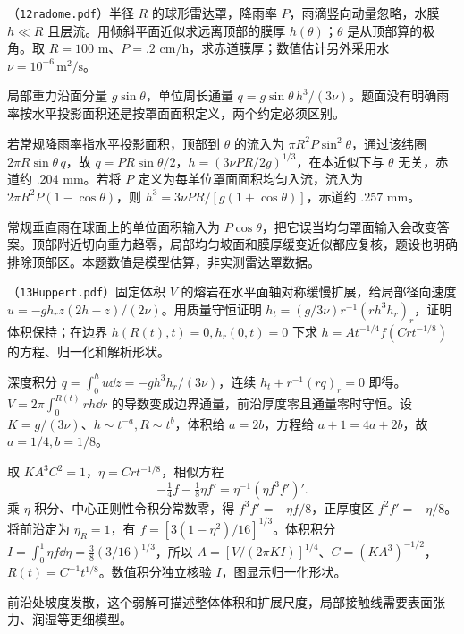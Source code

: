 \begin{exercise}
（\texttt{12radome.pdf}）半径 $R$ 的球形雷达罩，降雨率 $P$，雨滴竖向动量忽略，水膜 $h\ll R$ 且层流。用倾斜平面近似求远离顶部的膜厚 $h(\theta)$；$\theta$ 是从顶部算的极角。取 $R=100$ m、$P=.2$ cm/h，求赤道膜厚；数值估计另外采用水 $\nu=10^{-6}\,\mathrm{m^2/s}$。
\end{exercise}
\begin{solution}
局部重力沿面分量 $g\sin\theta$，单位周长通量 $q=g\sin\theta\,h^3/(3\nu)$。题面没有明确雨率按水平投影面积还是按罩面面积定义，两个约定必须区别。

若常规降雨率指水平投影面积，顶部到 $\theta$ 的流入为 $\pi R^2P\sin^2\theta$，通过该纬圈 $2\pi R\sin\theta\,q$，故 $q=PR\sin\theta/2$，$h=(3\nu PR/2g)^{1/3}$，在本近似下与 $\theta$ 无关，赤道约 $.204$ mm。若将 $P$ 定义为每单位罩面面积均匀入流，流入为 $2\pi R^2P(1-\cos\theta)$，则 $h^3=3\nu PR/[g(1+\cos\theta)]$，赤道约 $.257$ mm。

常规垂直雨在球面上的单位面积输入为 $P\cos\theta$，把它误当均匀罩面输入会改变答案。顶部附近切向重力趋零，局部均匀坡面和膜厚缓变近似都应复核，题设也明确排除顶部区。本题数值是模型估算，非实测雷达罩数据。
\end{solution}

\begin{exercise}
（\texttt{13Huppert.pdf}）固定体积 $V$ 的熔岩在水平面轴对称缓慢扩展，给局部径向速度 $u=-g h_r z(2h-z)/(2\nu)$。用质量守恒证明 $h_t=(g/3\nu)r^{-1}(rh^3h_r)_r$，证明体积保持；在边界 $h(R(t),t)=0,h_r(0,t)=0$ 下求 $h=A t^{-1/4}f(Crt^{-1/8})$ 的方程、归一化和解析形状。
\end{exercise}
\begin{solution}
深度积分 $q=\int_0^h u\dd z=-gh^3h_r/(3\nu)$，连续 $h_t+r^{-1}(rq)_r=0$ 即得。$V=2\pi\int_0^{R(t)}rh\dd r$ 的导数变成边界通量，前沿厚度零且通量零时守恒。设 $K=g/(3\nu)$、$h\sim t^{-a},R\sim t^b$，体积给 $a=2b$，方程给 $a+1=4a+2b$，故 $a=1/4,b=1/8$。

取 $KA^3C^2=1$，$\eta=Crt^{-1/8}$，相似方程
\[
-\tfrac14f-\tfrac18\eta f'=\eta^{-1}(\eta f^3f')'.
\]
乘 $\eta$ 积分、中心正则性令积分常数零，得 $f^3f'=-\eta f/8$，正厚度区 $f^2f'=-\eta/8$。将前沿定为 $\eta_R=1$，有 $f=[3(1-\eta^2)/16]^{1/3}$。体积积分 $I=\int_0^1\eta f\dd\eta=\tfrac38(3/16)^{1/3}$，所以 $A=[V/(2\pi KI)]^{1/4}$、$C=(KA^3)^{-1/2}$，$R(t)=C^{-1}t^{1/8}$。数值积分独立核验 $I$，图显示归一化形状。
\begin{center}\end{center}
前沿处坡度发散，这个弱解可描述整体体积和扩展尺度，局部接触线需要表面张力、润湿等更细模型。
\end{solution}

